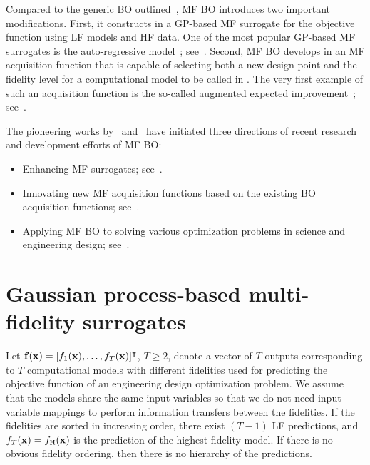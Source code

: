 \documentclass[iicol,sn-basic]{sn-jnl}%
\newcommand{\edit}[1]{\textcolor{red}{#1}} %
\begin{document}
Compared to the generic BO outlined~, MF BO introduces two important modifications.
First, it constructs in  a GP-based MF surrogate for the objective function using LF models and HF data.
One of the most popular GP-based MF surrogates is the auto-regressive model~\citep{Kennedy2000}; see~.
Second, MF BO develops in  an MF acquisition function that is capable of selecting both a new design point and the fidelity level for a computational model to be called in .
The very first example of such an acquisition function is the so-called augmented expected improvement~\citep{Huang2006smo}; see~. 

The pioneering works by~\cite{Kennedy2000} and~\cite{Huang2006smo} have initiated three
{directions}
of recent research and development efforts of MF BO:
\begin{itemize}
	\item Enhancing MF surrogates; see~.
	
	\item Innovating new MF acquisition functions based on the existing BO acquisition functions; see~.
	
	\item Applying MF BO to solving various optimization problems in science and engineering design; see~.	
\end{itemize}

\section{Gaussian process-based multi-fidelity surrogates}\label{Sec4}

Let ${\bf f}({\bf x})=[f_1({\bf x}),\dots,f_T({\bf x})]^\intercal$, $T \geq 2$, denote a vector of $T$ outputs corresponding to $T$ computational models with different fidelities used for predicting the objective function of an engineering design optimization problem.
We assume that the models share the same input variables so that we do not need input variable mappings to perform information transfers between the fidelities.
If the fidelities are sorted in increasing order, there exist $(T-1)$ LF predictions, and $f_T({\bf x})=f_\text{H}({\bf x})$ is the prediction of the highest-fidelity model.
If there is no obvious fidelity ordering, then there is no hierarchy of the predictions.
\end{document}
